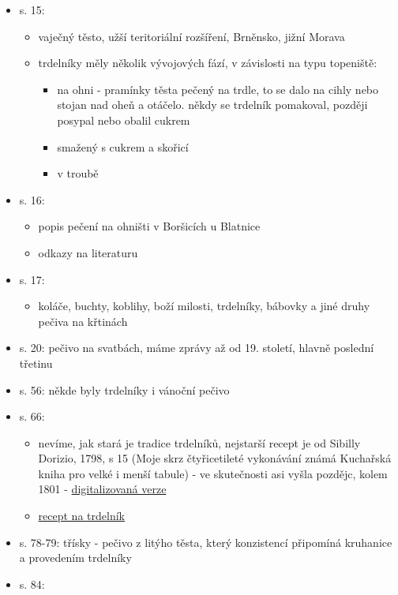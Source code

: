 \begin{itemize}
  \begin{itemize}
  \tightlist
  \item
    s. 15:

    \begin{itemize}
    \tightlist
    \item
      vaječný těsto, užší teritoriální rozšíření, Brněnsko, jižní Morava
    \item
      trdelníky měly několik vývojových fází, v závislosti na typu
      topeniště:

      \begin{itemize}
      \tightlist
      \item
        na ohni - pramínky těsta pečený na trdle, to se dalo na cihly
        nebo stojan nad oheň a otáčelo. někdy se trdelník pomakoval,
        později posypal nebo obalil cukrem
      \item
        smažený s cukrem a skořicí
      \item
        v troubě
      \end{itemize}
    \end{itemize}
  \item
    s. 16:

    \begin{itemize}
    \tightlist
    \item
      popis pečení na ohništi v Boršicích u Blatnice
    \item
      odkazy na literaturu
    \end{itemize}
  \item
    s. 17:

    \begin{itemize}
    \tightlist
    \item
      koláče, buchty, koblihy, boží milosti, trdelníky, bábovky a jiné
      druhy pečiva na křtinách
    \end{itemize}
  \item
    s. 20: pečivo na svatbách, máme zprávy až od 19. století, hlavně
    poslední třetinu
  \item
    s. 56: někde byly trdelníky i vánoční pečivo
  \item
    s. 66:

    \begin{itemize}
    \tightlist
    \item
      nevíme, jak stará je tradice trdelníků, nejstarší recept je od
      Sibilly Dorizio, 1798, s 15 (Moje skrz čtyřicetileté vykonávání
      známá Kuchařská kniha pro velké i menší tabule) - ve skutečnosti
      asi vyšla pozdějc, kolem 1801 -
      \href{https://books.google.cz/books?vid=NKP:1002400169&printsec=frontcover\#v=onepage&q&f=false}{digitalizovaná
      verze}
    \item
      \href{https://books.google.cz/books?vid=NKP:1002400169&printsec=frontcover\#v=onepage&q=trdel&f=false}{recept
      na trdelník}
    \end{itemize}
  \item
    s. 78-79: třísky - pečivo z litýho těsta, který konzistencí
    připomíná kruhanice a provedením trdelníky
  \item
    s. 84:


\end{itemize}
\end{itemize}
